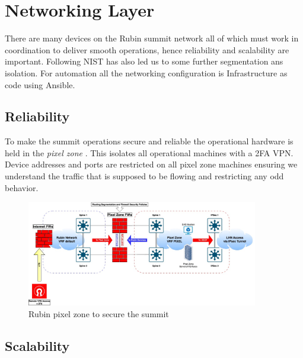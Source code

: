 \section{Networking Layer} \label{sec:networking}

There are many devices on the Rubin summit network all of which must work in coordination to deliver smooth operations, hence reliability and scalability are important.
Following NIST \citep{NIST.SP.800-171} has also led us to some further segmentation ans isolation.
For automation all the networking configuration is Infrastructure as code using Ansible.

\subsection{Reliability}

To make the summit operations secure and reliable the operational hardware is held in the \emph{pixel zone}
.
This isolates all operational machines with a 2FA VPN.
Device addresses and ports are restricted on all pixel zone machines ensuring we understand the traffic that
is supposed to be flowing and restricting any odd behavior.

\begin{figure}
\begin{centering}
\includegraphics[width=0.9\textwidth]{images/pixel-zone}
        \caption{Rubin pixel zone to secure the summit
\label{fig:pixel-zone}}
\end{centering}
\end{figure}

\subsection{Scalability}
